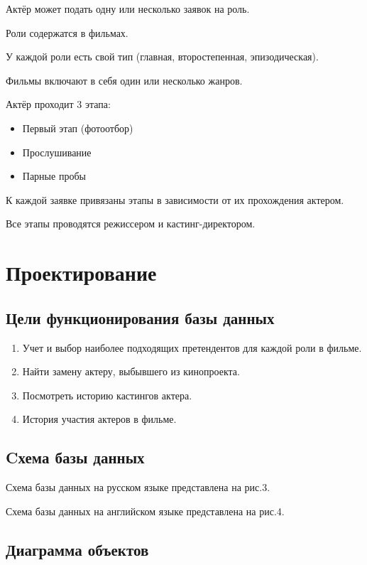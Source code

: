 \documentclass[11pt,a4paper,final]{article} %
\begin{document}
\par Актёр может подать одну или несколько заявок на роль.
\par Роли содержатся в фильмах.
\par У каждой роли есть свой тип (главная, второстепенная, эпизодическая).
\par Фильмы включают в себя один или несколько жанров.
\par Актёр проходит 3 этапа:
\begin{itemize}[itemindent=2em]
	\item Первый этап (фотоотбор)
	\item Прослушивание
	\item Парные пробы
\end{itemize}
\par К каждой заявке привязаны этапы в зависимости от их прохождения актером.
\par Все этапы проводятся режиссером и кастинг-директором.

\newpage

\setcounter{figure}{1}

\newpage 
\section{Проектирование}

\subsection{Цели функционирования базы данных}
\begin{enumerate}
	\item Учет и выбор наиболее подходящих претендентов для каждой роли в фильме. 
	\item Найти замену актеру, выбывшего из кинопроекта. 
	\item Посмотреть историю кастингов актера. 
	\item История участия актеров в фильме.
\end{enumerate}


\subsection{Cхема базы данных}
\par Схема базы данных на русском языке представлена на рис.3.
\par Схема базы данных на английском языке представлена на рис.4.

\subsection{Диаграмма объектов}
\end{document}
